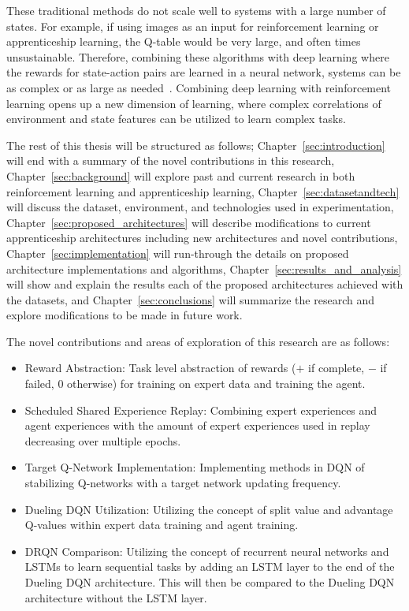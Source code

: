\documentclass[12pt,american]{report}
\begin{document}
These traditional methods do not scale well to systems with a large number of states.  For example, if using images as an input for reinforcement learning or apprenticeship learning, the Q-table would be very large, and often times unsustainable.  Therefore, combining these algorithms with deep learning where the rewards for state-action pairs are learned in a neural network, systems can be as complex or as large as needed~\cite{matiisen_2015}. Combining deep learning with reinforcement learning opens up a new dimension of learning, where complex correlations of environment and state features can be utilized to learn complex tasks.

The rest of this thesis will be structured as follows; Chapter~\ref{sec:introduction} will end with a summary of the novel contributions in this research, Chapter~\ref{sec:background} will explore past and current research in both reinforcement learning and apprenticeship learning, Chapter~\ref{sec:datasetandtech} will discuss the dataset, environment, and technologies used in experimentation, Chapter~\ref{sec:proposed_architectures} will describe modifications to current apprenticeship architectures including new architectures and novel contributions, Chapter~\ref{sec:implementation} will run-through the details on proposed architecture implementations and algorithms, Chapter~\ref{sec:results_and_analysis} will show and explain the results each of the proposed architectures achieved with the datasets, and Chapter~\ref{sec:conclusions} will summarize the research and explore modifications to be made in future work.

The novel contributions and areas of exploration of this research are as follows:
\begin{itemize}
  \item Reward Abstraction: Task level abstraction of rewards ($+$ if complete, $-$ if failed, $0$ otherwise) for training on expert data and training the agent.
  \item Scheduled Shared Experience Replay: Combining expert experiences and agent experiences with the amount of expert experiences used in replay decreasing over multiple epochs.
  \item Target Q-Network Implementation: Implementing methods in DQN of stabilizing Q-networks with a target network updating frequency.
  \item Dueling DQN Utilization: Utilizing the concept of split value and advantage Q-values within expert data training and agent training.
  \item DRQN Comparison: Utilizing the concept of recurrent neural networks and LSTMs to learn sequential tasks by adding an LSTM layer to the end of the Dueling DQN architecture. This will then be compared to the Dueling DQN architecture without the LSTM layer.
\end{itemize}
\end{document}
